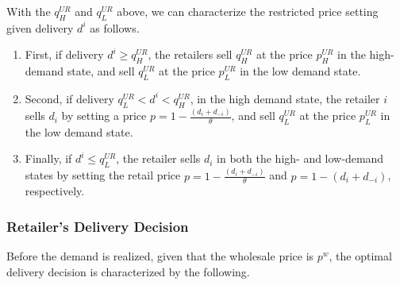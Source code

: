 \documentclass[12pt]{article}
\begin{document}
With the $q_{H}^{UR}$ and $q_{L}^{UR}$ above, we can characterize the restricted price setting given delivery $d^i$ as follows.
\begin{enumerate}
    \item First, if delivery $d^{i} \geq q_{H}^{UR}$, the retailers sell  $q_{H}^{UR}$ at the price  $p_{H}^{UR}$ in the high-demand state,  and sell $q_{L}^{UR}$ at the price $p_{L}^{UR}$ in the low demand state. 
    \item Second, if delivery $ q_{L}^{UR} < d^{i} < q_{H}^{UR}$, in the high demand state, the retailer $i$ sells $d_i$ by setting a price $p = 1 - \frac{(d_i + d_{-i})}{\theta}$, and sell $q_{L}^{UR}$ at the price $p_{L}^{UR}$ in the low demand state.
    \item Finally, if $d^{i} \leq q_{L}^{UR}$, the retailer sells $d_i$ in both the high- and low-demand states by setting the retail price $p = 1 - \frac{(d_i + d_{-i})}{\theta}$ and $p = 1 - (d_i + d_{-i})$, respectively. 
\end{enumerate}

\subsubsection{Retailer's Delivery Decision}
Before the demand is realized, given that the wholesale price is $p^w$, the optimal delivery decision is characterized by the following. 




\end{document}
